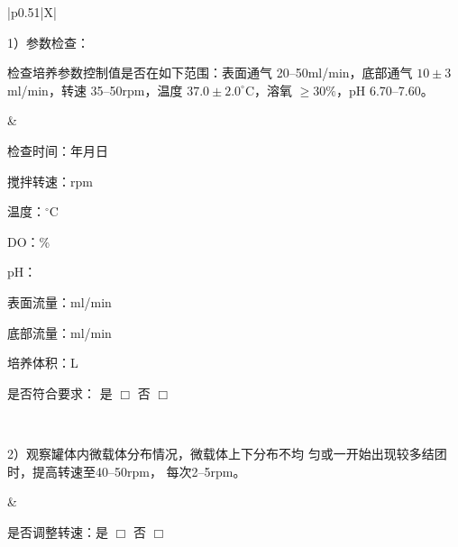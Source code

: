 \documentclass[UTF8,10pt,a4paper,fontset=fandol]{ctexart}
\newcommand{\fieldvalue}[1]{#1}
\newcommand{\handwritten}[1]{#1}
\begin{document}
\noindent
\begin{tabularx}{\textwidth}{|p{0.51\textwidth}|X|}
\hline
\begin{minipage}[t]{\linewidth}
\vspace{2pt}
1）参数检查：

检查培养参数控制值是否在如下范围：表面通气
20--50ml/min，底部通气 $10\pm3$ml/min，转速
35--50rpm，温度 $37.0\pm2.0^\circ\mathrm{C}$，溶氧
$\geq30\%$，pH 6.70--7.60。
\vspace{4pt}
\end{minipage}
&
\begin{minipage}[t]{\linewidth}
\vspace{2pt}
检查时间：\underline{\hspace{0.45cm}}年\underline{\hspace{0.45cm}}月\underline{\hspace{0.45cm}}日

搅拌转速：\underline{\hspace{0.7cm}}rpm

温度：\underline{\hspace{0.8cm}}$^\circ$C

DO：\underline{\hspace{0.8cm}}\%

pH：\underline{\hspace{1.2cm}}

表面流量：\underline{\hspace{0.8cm}}ml/min

底部流量：\underline{\hspace{0.8cm}}ml/min

培养体积：\underline{\hspace{0.8cm}}L

是否符合要求：
\fieldvalue{\handwritten{是}} $\Box$ \quad 否 $\Box$
\vspace{2pt}
\end{minipage}
\\
\hline
\begin{minipage}[t]{\linewidth}
\vspace{2pt}
2）观察罐体内微载体分布情况，微载体上下分布不均
匀或一开始出现较多结团时，提高转速至40--50rpm，
每次2--5rpm。
\vspace{4pt}
\end{minipage}
&
\begin{minipage}[t]{\linewidth}
\vspace{2pt}
是否调整转速：是 $\Box$ \quad 否 $\Box$


\end{minipage}
\end{tabularx}
\end{document}
